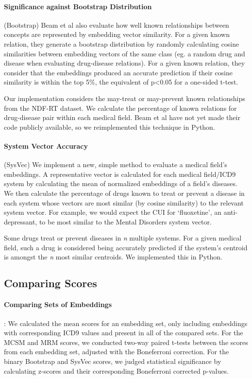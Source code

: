 \documentclass[11pt,a4paper]{article}
\begin{document}
\paragraph{Significance against Bootstrap Distribution}(Bootstrap)
Beam et al  also evaluate how well known relationships between concepts are represented by embedding vector similarity. For a given known relation, they generate a bootstrap distribution by randomly calculating cosine similarities between embedding vectors of the same class (eg. a random drug and disease when evaluating  drug-disease relations). For a given known relation, they consider that the embeddings produced an accurate prediction if their cosine similarity is within the top 5\%, the equivalent of p<0.05 for a one-sided t-test. 

Our implementation considers the may-treat or may-prevent known relationships from the NDF-RT dataset. We calculate the percentage of known relations for drug-disease pair within each medical field. Beam et al have not yet made their code publicly available, so we reimplemented this technique in Python. 

\paragraph{System Vector Accuracy}(SysVec)
We implement a new, simple method to evaluate a medical field's embeddings. A representative vector is calculated for each medical field/ICD9 system by calculating the mean of normalized embeddings of a field's diseases. We then calculate the percentage of drugs known to treat or prevent a disease in each system whose vectors are most similar (by cosine similarity) to the relevant system vector. For example, we would expect the CUI for `fluoxetine', an anti-depressant, to be most similar to the Mental Disorders system vector. 

Some drugs treat or prevent diseases in \emph{n} multiple systems. For a given medical field, such a drug is considered being accurately predicted if the system's centroid is amongst the \emph{n} most similar centroids. We implemented this in Python. 

\subsection{Comparing Scores}

\paragraph{Comparing Sets of Embeddings}: We calculated the mean scores for an embedding set, only including embeddings with corresponding ICD9 values and present in all of the compared sets. For the MCSM and MRM scores, we conducted two-way paired t-tests between the scores from each embedding set, adjusted with the Boneferroni correction. For the binary Bootstrap and SysVec scores, we judged statistical significance by calculating z-scores and their corresponding Boneferroni corrected p-values. 
\end{document}
